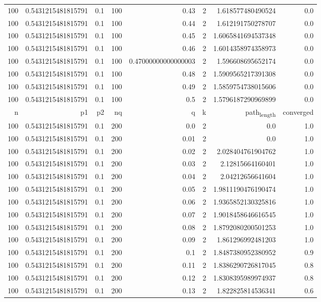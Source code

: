 \documentclass[11pt]{article}
\begin{document}
\begin{center}
\begin{tabular}{rrrrrrrr}
100 & 0.5431215481815791 & 0.1 & 100 & 0.43 & 2 & 1.618577480490524 & 0.0\\
100 & 0.5431215481815791 & 0.1 & 100 & 0.44 & 2 & 1.612191750278707 & 0.0\\
100 & 0.5431215481815791 & 0.1 & 100 & 0.45 & 2 & 1.6065841694537348 & 0.0\\
100 & 0.5431215481815791 & 0.1 & 100 & 0.46 & 2 & 1.6014358974358973 & 0.0\\
100 & 0.5431215481815791 & 0.1 & 100 & 0.47000000000000003 & 2 & 1.596608695652174 & 0.0\\
100 & 0.5431215481815791 & 0.1 & 100 & 0.48 & 2 & 1.5909565217391308 & 0.0\\
100 & 0.5431215481815791 & 0.1 & 100 & 0.49 & 2 & 1.5859754738015606 & 0.0\\
100 & 0.5431215481815791 & 0.1 & 100 & 0.5 & 2 & 1.5796187290969899 & 0.0\\
\hline
n & p1 & p2 & nq & q & k & path\textsubscript{length} & converged\\
100 & 0.5431215481815791 & 0.1 & 200 & 0.0 & 2 & 0.0 & 1.0\\
100 & 0.5431215481815791 & 0.1 & 200 & 0.01 & 2 & 0.0 & 1.0\\
100 & 0.5431215481815791 & 0.1 & 200 & 0.02 & 2 & 2.028404761904762 & 1.0\\
100 & 0.5431215481815791 & 0.1 & 200 & 0.03 & 2 & 2.12815664160401 & 1.0\\
100 & 0.5431215481815791 & 0.1 & 200 & 0.04 & 2 & 2.04212656641604 & 1.0\\
100 & 0.5431215481815791 & 0.1 & 200 & 0.05 & 2 & 1.9811190476190474 & 1.0\\
100 & 0.5431215481815791 & 0.1 & 200 & 0.06 & 2 & 1.9365852130325816 & 1.0\\
100 & 0.5431215481815791 & 0.1 & 200 & 0.07 & 2 & 1.9018458646616545 & 1.0\\
100 & 0.5431215481815791 & 0.1 & 200 & 0.08 & 2 & 1.8792080200501253 & 1.0\\
100 & 0.5431215481815791 & 0.1 & 200 & 0.09 & 2 & 1.861296992481203 & 1.0\\
100 & 0.5431215481815791 & 0.1 & 200 & 0.1 & 2 & 1.8487380952380952 & 0.9\\
100 & 0.5431215481815791 & 0.1 & 200 & 0.11 & 2 & 1.8386290726817045 & 0.8\\
100 & 0.5431215481815791 & 0.1 & 200 & 0.12 & 2 & 1.8308395989974937 & 0.8\\
100 & 0.5431215481815791 & 0.1 & 200 & 0.13 & 2 & 1.822825814536341 & 0.6\\

\end{tabular}
\end{center}
\end{document}

